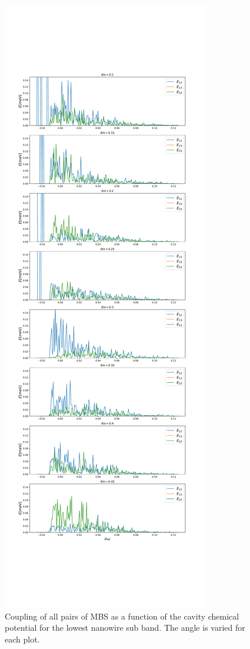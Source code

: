 \documentclass[10pt,twocolumn,aps,superscriptaddress, floatfix,notitlepage]{revtex4-1}
\begin{document}
\begin{figure}[h!]
  \centering
  \includegraphics[width=\linewidth]{figures/triangle_coupling_lowest_band.pdf}
  \caption{Coupling of all pairs of MBS as a function of the cavity chemical potential for the lowest nanowire sub band. The angle is varied for each plot.}
  \label{fig:angles}
\end{figure}
\end{document}
